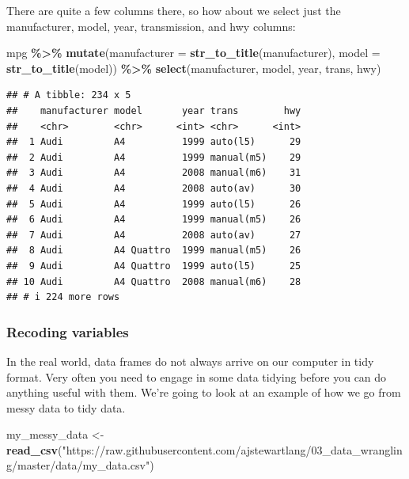 \documentclass[
]{book}
\newenvironment{Shaded}{\begin{snugshade}}{\end{snugshade}}
\newcommand{\AttributeTok}[1]{\textcolor[rgb]{0.13,0.29,0.53}{#1}}
\newcommand{\FunctionTok}[1]{\textcolor[rgb]{0.13,0.29,0.53}{\textbf{#1}}}
\newcommand{\NormalTok}[1]{#1}
\newcommand{\OtherTok}[1]{\textcolor[rgb]{0.56,0.35,0.01}{#1}}
\newcommand{\SpecialCharTok}[1]{\textcolor[rgb]{0.81,0.36,0.00}{\textbf{#1}}}
\newcommand{\StringTok}[1]{\textcolor[rgb]{0.31,0.60,0.02}{#1}}
\begin{document}
There are quite a few columns there, so how about we select just the manufacturer, model, year, transmission, and hwy columns:

\begin{Shaded}
\begin{Highlighting}[]
\NormalTok{mpg }\SpecialCharTok{\%\textgreater{}\%}
  \FunctionTok{mutate}\NormalTok{(}\AttributeTok{manufacturer =} \FunctionTok{str\_to\_title}\NormalTok{(manufacturer), }\AttributeTok{model =} \FunctionTok{str\_to\_title}\NormalTok{(model)) }\SpecialCharTok{\%\textgreater{}\%}
  \FunctionTok{select}\NormalTok{(manufacturer, model, year, trans, hwy)}
\end{Highlighting}
\end{Shaded}

\begin{verbatim}
## # A tibble: 234 x 5
##    manufacturer model       year trans        hwy
##    <chr>        <chr>      <int> <chr>      <int>
##  1 Audi         A4          1999 auto(l5)      29
##  2 Audi         A4          1999 manual(m5)    29
##  3 Audi         A4          2008 manual(m6)    31
##  4 Audi         A4          2008 auto(av)      30
##  5 Audi         A4          1999 auto(l5)      26
##  6 Audi         A4          1999 manual(m5)    26
##  7 Audi         A4          2008 auto(av)      27
##  8 Audi         A4 Quattro  1999 manual(m5)    26
##  9 Audi         A4 Quattro  1999 auto(l5)      25
## 10 Audi         A4 Quattro  2008 manual(m6)    28
## # i 224 more rows
\end{verbatim}

\hypertarget{recoding-variables}{%
\subsubsection*{Recoding variables}\label{recoding-variables}}

In the real world, data frames do not always arrive on our computer in tidy format. Very often you need to engage in some data tidying before you can do anything useful with them. We're going to look at an example of how we go from messy data to tidy data.

\begin{Shaded}
\begin{Highlighting}[]
\NormalTok{my\_messy\_data }\OtherTok{\textless{}{-}} \FunctionTok{read\_csv}\NormalTok{(}\StringTok{"https://raw.githubusercontent.com/ajstewartlang/03\_data\_wrangling/master/data/my\_data.csv"}\NormalTok{)}
\end{Highlighting}
\end{Shaded}
\end{document}
